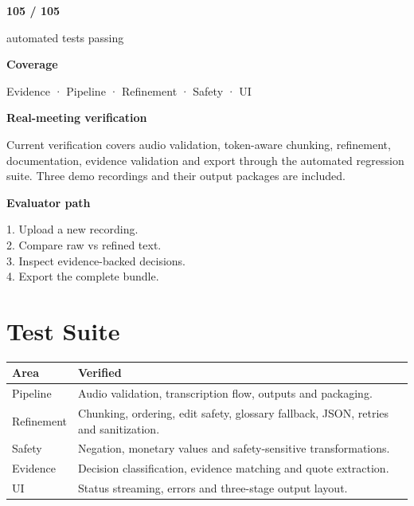\documentclass[9pt,a4paper]{extarticle}
\begin{document}
\begin{minipage}[t]{0.44\textwidth}
\begin{darkcard}\centering\fontsize{20}{22}\selectfont\bfseries 105 / 105\par\vspace{1pt}\normalsize automated tests passing\end{darkcard}
\begin{card}\small
\textbf{Coverage}\par\vspace{1pt}
Evidence · Pipeline · Refinement · Safety · UI
\end{card}
\begin{card}\small
\textbf{Real-meeting verification}\par\vspace{1pt}
Current verification covers audio validation, token-aware chunking, refinement, documentation, evidence validation and export through the automated regression suite. Three demo recordings and their output packages are included.
\end{card}
\begin{darkcard}\small
\textbf{Evaluator path}\par\vspace{1pt}
1. Upload a new recording.\\
2. Compare raw vs refined text.\\
3. Inspect evidence-backed decisions.\\
4. Export the complete bundle.
\end{darkcard}
\end{minipage}

\vspace{1.5pt}
\section*{Test Suite}
\scriptsize
\begin{tabularx}{\textwidth}{@{}l X@{}}
\toprule
\textbf{Area} & \textbf{Verified}\\
\midrule
Pipeline & Audio validation, transcription flow, outputs and packaging.\\
Refinement & Chunking, ordering, edit safety, glossary fallback, JSON, retries and sanitization.\\
Safety & Negation, monetary values and safety-sensitive transformations.\\
Evidence & Decision classification, evidence matching and quote extraction.\\
UI & Status streaming, errors and three-stage output layout.\\
\bottomrule
\end{tabularx}
\end{document}
